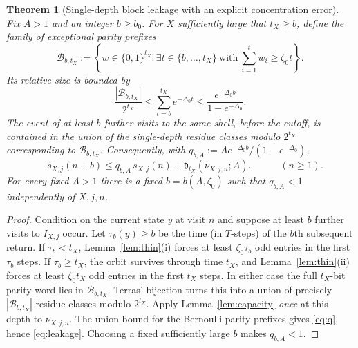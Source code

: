 \documentclass[11pt,a4paper]{article}
\newtheorem{theorem}{Theorem}
\begin{document}
\begin{theorem}[Single-depth block leakage with an explicit concentration error]\label{thm:block}
Fix $A>1$ and an integer $b\ge b_0$. For $X$ sufficiently large that $t_X\ge b$, define the family of exceptional parity prefixes
\begin{equation}\label{eq:badword}
 \mathcal B_{b,t_X}:=\left\{w\in\{0,1\}^{t_X}:\exists t\in\{b,\dots,t_X\}\ \text{with}\ \sum_{i=1}^{t}w_i\ge\zeta_0t\right\}.
\end{equation}
Its relative size is bounded by
\begin{equation}\label{eq:q}
 \frac{|\mathcal B_{b,t_X}|}{2^{t_X}}
 \le\sum_{t=b}^{t_X}e^{-\Delta_0t}
 \le\frac{e^{-\Delta_0b}}{1-e^{-\Delta_0}}.
\end{equation}
The event of at least $b$ further visits to the same shell, before the cutoff, is contained in the union of the \emph{single-depth} residue classes modulo $2^{t_X}$ corresponding to $\mathcal B_{b,t_X}$. Consequently, with
$q_{b,A}:=A e^{-\Delta_0b}/(1-e^{-\Delta_0})$,
\begin{equation}\label{eq:leakage}
 \boxed{\quad s_{X,j}(n+b)\le q_{b,A}\,s_{X,j}(n)
      +\mathfrak d_{t_X}(\nu_{X,j,n};A).\quad}\qquad(n\ge1).
\end{equation}
For every fixed $A>1$ there is a fixed $b=b(A,\zeta_0)$ such that $q_{b,A}<1$ independently of $X,j,n$.
\end{theorem}
\begin{proof}
Condition on the current state $y$ at visit $n$ and suppose at least $b$ further visits to $I_{X,j}$ occur. Let $\tau_b(y)\ge b$ be the time (in $T$-steps) of the $b$th subsequent return. If $\tau_b<t_X$, Lemma~\ref{lem:thin}(i) forces at least $\zeta_0\tau_b$ odd entries in the first $\tau_b$ steps. If $\tau_b\ge t_X$, the orbit survives through time $t_X$, and Lemma~\ref{lem:thin}(ii) forces at least $\zeta_0t_X$ odd entries in the first $t_X$ steps. In either case the full $t_X$-bit parity word lies in $\mathcal B_{b,t_X}$. Terras' bijection turns this into a union of precisely $|\mathcal B_{b,t_X}|$ residue classes modulo $2^{t_X}$. Apply Lemma~\ref{lem:capacity} \emph{once} at this depth to $\nu_{X,j,n}$. The union bound for the Bernoulli parity prefixes gives \eqref{eq:q}, hence \eqref{eq:leakage}. Choosing a fixed sufficiently large $b$ makes $q_{b,A}<1$.
\end{proof}
\end{document}
